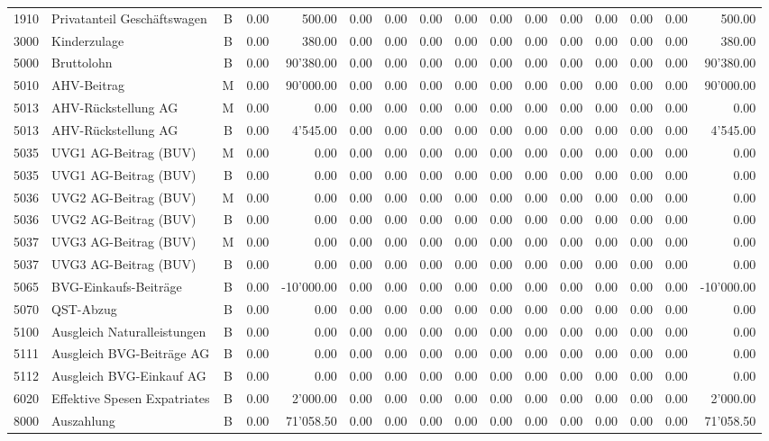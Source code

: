 \documentclass[8pt,a4paper]{extarticle}
\begin{document}
\begin{longtable}{@{\extracolsep{\fill}} l l c r r r r r r r r r r r r r}
1910&Privatanteil Geschäftswagen&B&0.00&500.00&0.00&0.00&0.00&0.00&0.00&0.00&0.00&0.00&0.00&0.00&500.00\\
3000&Kinderzulage&B&0.00&380.00&0.00&0.00&0.00&0.00&0.00&0.00&0.00&0.00&0.00&0.00&380.00\\
5000&Bruttolohn&B&0.00&90'380.00&0.00&0.00&0.00&0.00&0.00&0.00&0.00&0.00&0.00&0.00&90'380.00\\
5010&AHV-Beitrag&M&0.00&90'000.00&0.00&0.00&0.00&0.00&0.00&0.00&0.00&0.00&0.00&0.00&90'000.00\\
5013&AHV-Rückstellung AG&M&0.00&0.00&0.00&0.00&0.00&0.00&0.00&0.00&0.00&0.00&0.00&0.00&0.00\\
5013&AHV-Rückstellung AG&B&0.00&4'545.00&0.00&0.00&0.00&0.00&0.00&0.00&0.00&0.00&0.00&0.00&4'545.00\\
5035&UVG1 AG-Beitrag (BUV)&M&0.00&0.00&0.00&0.00&0.00&0.00&0.00&0.00&0.00&0.00&0.00&0.00&0.00\\
5035&UVG1 AG-Beitrag (BUV)&B&0.00&0.00&0.00&0.00&0.00&0.00&0.00&0.00&0.00&0.00&0.00&0.00&0.00\\
5036&UVG2 AG-Beitrag (BUV)&M&0.00&0.00&0.00&0.00&0.00&0.00&0.00&0.00&0.00&0.00&0.00&0.00&0.00\\
5036&UVG2 AG-Beitrag (BUV)&B&0.00&0.00&0.00&0.00&0.00&0.00&0.00&0.00&0.00&0.00&0.00&0.00&0.00\\
5037&UVG3 AG-Beitrag (BUV)&M&0.00&0.00&0.00&0.00&0.00&0.00&0.00&0.00&0.00&0.00&0.00&0.00&0.00\\
5037&UVG3 AG-Beitrag (BUV)&B&0.00&0.00&0.00&0.00&0.00&0.00&0.00&0.00&0.00&0.00&0.00&0.00&0.00\\
5065&BVG-Einkaufs-Beiträge&B&0.00&-10'000.00&0.00&0.00&0.00&0.00&0.00&0.00&0.00&0.00&0.00&0.00&-10'000.00\\
5070&QST-Abzug&B&0.00&0.00&0.00&0.00&0.00&0.00&0.00&0.00&0.00&0.00&0.00&0.00&0.00\\
5100&Ausgleich Naturalleistungen&B&0.00&0.00&0.00&0.00&0.00&0.00&0.00&0.00&0.00&0.00&0.00&0.00&0.00\\
5111&Ausgleich BVG-Beiträge AG&B&0.00&0.00&0.00&0.00&0.00&0.00&0.00&0.00&0.00&0.00&0.00&0.00&0.00\\
5112&Ausgleich BVG-Einkauf AG&B&0.00&0.00&0.00&0.00&0.00&0.00&0.00&0.00&0.00&0.00&0.00&0.00&0.00\\
6020&Effektive Spesen Expatriates&B&0.00&2'000.00&0.00&0.00&0.00&0.00&0.00&0.00&0.00&0.00&0.00&0.00&2'000.00\\
8000&Auszahlung&B&0.00&71'058.50&0.00&0.00&0.00&0.00&0.00&0.00&0.00&0.00&0.00&0.00&71'058.50\\

\end{longtable}
\end{document}
